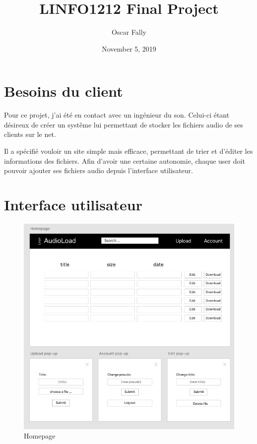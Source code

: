 \documentclass[a4paper,12pt,french]{article}
\begin{document}
\title{\Large{\textbf{LINFO1212 Final Project}}}
\author{Oscar Fally}
\date{November 5, 2019}

\maketitle
\tableofcontents
\setcounter{page}{0}

\clearpage

\section{Besoins du client}

Pour ce projet, j'ai été en contact avec un ingénieur du son. Celui-ci étant désireux 
de créer un systême lui permettant de stocker les fichiers audio de ses clients sur le net. 
\par
Il a spécifié vouloir un site simple mais efficace, permettant de trier 
et d'éditer les informations des fichiers.
Afin d'avoir une certaine autonomie, chaque user doit pouvoir ajouter 
ses fichiers audio depuis l'interface utilisateur.

\section{Interface utilisateur}

\begin{figure}[ht]
\centering
\includegraphics[width=13cm]{../prototype/homepage}
\caption{Homepage}
\end{figure}
\end{document}

